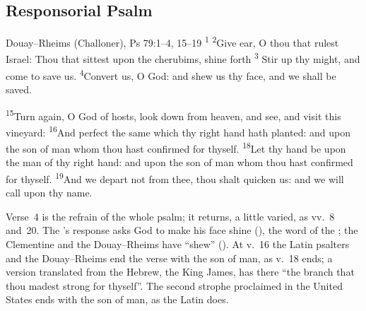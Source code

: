 \subsection{Responsorial Psalm}
\label{proper-responsorial-psalm}


\begin{englishwitness}{Douay--Rheims (Challoner), Ps 79:1--4, 15--19}
\textsuperscript{1} \textsuperscript{2}Give ear, O thou that rulest
Israel:  Thou that sittest
upon the cherubims, shine forth \textsuperscript{3} Stir up thy might, and come to save us.
\textsuperscript{4}Convert us, O God: and shew us thy face, and we shall be
saved.


\textsuperscript{15}Turn again, O God of hosts, look down from heaven, and
see, and visit this vineyard: \textsuperscript{16}And perfect the same which
thy right hand hath planted: and upon the son of man whom thou hast confirmed
for thyself. 
\textsuperscript{18}Let thy hand be upon the man of thy right hand: and upon
the son of man whom thou hast confirmed for thyself.
\textsuperscript{19}And we depart not from thee, thou shalt quicken us: and we
will call upon thy name.
\end{englishwitness}

\noindent Verse~4 is the refrain of the whole psalm; it returns, a little
varied, as vv.~8 and~20. The 's response asks God to make his face
shine (), the word of the ; the Clementine
and the Douay--Rheims have ``shew'' (). At v.~16 the Latin
psalters and the Douay--Rheims end the verse with the son of man, as v.~18
ends; a version translated from the Hebrew, the King James, has there ``the
branch that thou madest strong for thyself''. The second strophe proclaimed
in the United States ends with the son of man, as the Latin does.

